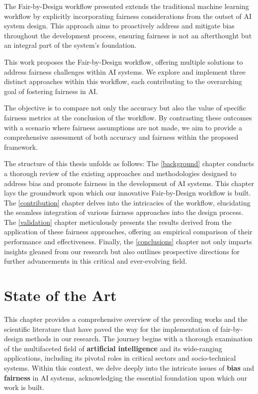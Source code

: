 \documentclass[12pt,a4paper,openright,twoside]{book}
\begin{document}
The Fair-by-Design workflow presented extends the traditional machine learning workflow by explicitly incorporating fairness considerations from the outset of AI system design. This approach aims to proactively address and mitigate bias throughout the development process, ensuring fairness is not an afterthought but an integral part of the system's foundation.

This work proposes the Fair-by-Design workflow, offering multiple solutions to address fairness challenges within AI systems. We explore and implement three distinct approaches within this workflow, each contributing to the overarching goal of fostering fairness in AI.

The objective is to compare not only the accuracy but also the value of specific fairness metrics at the conclusion of the workflow. By contrasting these outcomes with a scenario where fairness assumptions are not made, we aim to provide a comprehensive assessment of both accuracy and fairness within the proposed framework.

The structure of this thesis unfolds as follows: The \cref{background} chapter conducts a thorough review of the existing approaches and methodologies designed to address bias and promote fairness in the development of AI systems. This chapter lays the groundwork upon which our innovative Fair-by-Design workflow is built. The \cref{contribution} chapter delves into the intricacies of the workflow, elucidating the seamless integration of various fairness approaches into the design process. The \cref{validation} chapter meticulously presents the results derived from the application of these fairness approaches, offering an empirical comparison of their performance and effectiveness. Finally, the \cref{conclusions} chapter not only imparts insights gleaned from our research but also outlines prospective directions for further advancements in this critical and ever-evolving field.

\chapter{State of the Art} %
\label{chap:background}

This chapter provides a comprehensive overview of the preceding works and the scientific literature that have paved the way for the implementation of fair-by-design methods in our research. The journey begins with a thorough examination of the multifaceted field of \textbf{artificial intelligence} and its wide-ranging applications, including its pivotal roles in critical sectors and socio-technical systems. Within this context, we delve deeply into the intricate issues of \textbf{bias} and \textbf{fairness} in AI systems, acknowledging the essential foundation upon which our work is built. 
\end{document}
